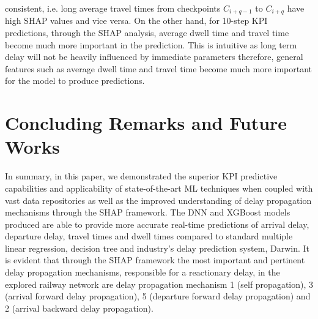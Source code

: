 \documentclass[]{interact}
\theoremstyle{plain}%
\theoremstyle{definition}
\theoremstyle{remark}
\begin{document}
consistent, i.e. long average travel times from checkpoints $C_{i+q-1}$ to $C_{i+q}$ have high SHAP values and vice versa. On the other hand, for 10-step KPI predictions, through the SHAP analysis, average dwell time and travel time become much more important in the prediction. This is intuitive as long term delay will not be heavily influenced by immediate parameters therefore, general features such as average dwell time and travel time become much more important for the model to produce predictions.

\section{Concluding Remarks and Future Works}
In summary, in this paper, we demonstrated the superior KPI predictive capabilities and applicability of state-of-the-art ML techniques when coupled with vast data repositories as well as the improved understanding of delay propagation mechanisms through the SHAP framework.  The DNN and XGBoost models produced are able to provide more accurate real-time predictions of arrival delay, departure delay, travel times and dwell times compared to standard multiple linear regression, decision tree and industry's delay prediction system, Darwin. It is evident that through the SHAP framework the most important and pertinent delay propagation mechanisms, responsible for a reactionary delay, in the explored railway network are delay propagation mechanism 1 (self propagation), 3 (arrival forward delay propagation), 5 (departure forward delay propagation) and 2 (arrival backward delay propagation). 
\end{document}
